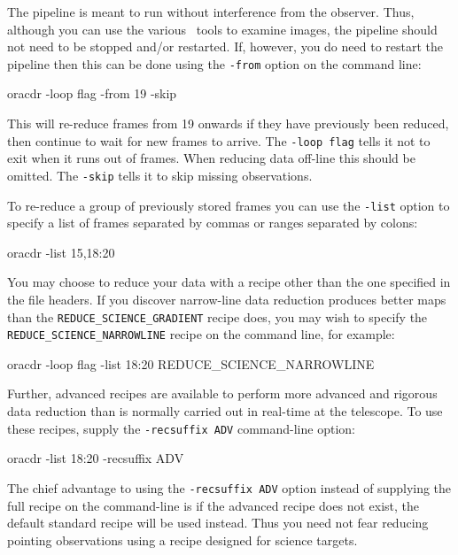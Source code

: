 \documentclass[twoside,11pt,nolof]{starlink}
\providecommand{\GAIA}{\xref{{\sc{Gaia}}}{sun214}{}}
\begin{document}
The pipeline is meant to run without interference from the observer.
Thus, although you can use the various \GAIA\ tools to examine images,
the pipeline should not need to be stopped and/or restarted. If,
however, you do need to restart the pipeline then this can be done
using the \texttt{-from} option on the command line:

\begin{terminalv}
      oracdr -loop flag -from 19 -skip
\end{terminalv}

This will re-reduce frames from 19 onwards if they have previously
been reduced, then continue to wait for new frames to arrive. The \texttt{-loop flag} tells it not to exit when it runs out of frames. When
reducing data off-line this should be omitted. The \texttt{-skip} tells it to
skip missing observations.

To re-reduce a group of
previously stored frames you can use the \texttt{-list} option to specify
a list of frames separated by commas or ranges separated by colons:

\begin{terminalv}
      oracdr -list 15,18:20
\end{terminalv}

You may choose to reduce your data with a recipe other than the one specified
in the file headers. If you discover narrow-line data reduction produces
better maps than the \texttt{REDUCE\_SCIENCE\_GRADIENT} recipe does, you may wish
to specify the \texttt{REDUCE\_SCIENCE\_NARROWLINE} recipe on the command line,
for example:

\begin{terminalv}
      oracdr -loop flag -list 18:20 REDUCE\_SCIENCE\_NARROWLINE
\end{terminalv}

Further, advanced recipes are available to perform more advanced and rigorous
data reduction than is normally carried out in real-time at the telescope. To
use these recipes, supply the \texttt{-recsuffix ADV} command-line option:

\begin{terminalv}
      oracdr -list 18:20 -recsuffix ADV
\end{terminalv}

The chief advantage to using the \texttt{-recsuffix ADV} option instead of
supplying the full recipe on the command-line is if the advanced recipe does
not exist, the default standard recipe will be used instead. Thus you need not
fear reducing pointing observations using a recipe designed for science
targets.
\end{document}
